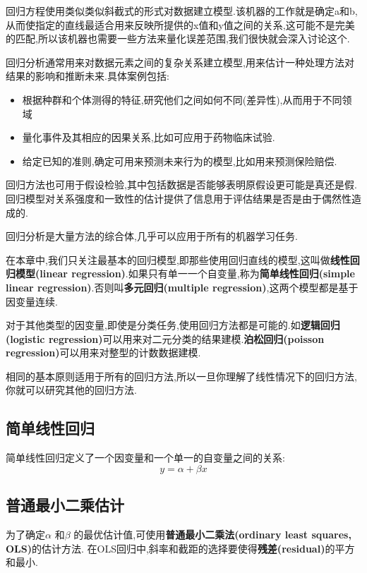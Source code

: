\documentclass[11pt,a4paper,oneside]{book}
\begin{document}
回归方程使用类似类似斜截式的形式对数据建立模型.该机器的工作就是确定a和b,从而使指定的直线最适合用来反映所提供的x值和y值之间的关系,这可能不是完美的匹配,所以该机器也需要一些方法来量化误差范围,我们很快就会深入讨论这个.

回归分析通常用来对数据元素之间的复杂关系建立模型,用来估计一种处理方法对结果的影响和推断未来.具体案例包括:
\begin{itemize}
	\item 根据种群和个体测得的特征,研究他们之间如何不同(差异性),从而用于不同领域
	\item 量化事件及其相应的因果关系,比如可应用于药物临床试验.
	\item 给定已知的准则,确定可用来预测未来行为的模型,比如用来预测保险赔偿.
\end{itemize}

回归方法也可用于假设检验,其中包括数据是否能够表明原假设更可能是真还是假.回归模型对关系强度和一致性的估计提供了信息用于评估结果是否是由于偶然性造成的.

回归分析是大量方法的综合体,几乎可以应用于所有的机器学习任务.

在本章中,我们只关注最基本的回归模型,即那些使用回归直线的模型,这叫做\textbf{线性回归模型(linear regression)}.如果只有单一一个自变量,称为\textbf{简单线性回归(simple linear regression)}.否则叫\textbf{多元回归(multiple regression)},这两个模型都是基于因变量连续.

对于其他类型的因变量,即使是分类任务,使用回归方法都是可能的.如\textbf{逻辑回归(logistic regression)}可以用来对二元分类的结果建模.\textbf{泊松回归(poisson regression)}可以用来对整型的计数数据建模.

相同的基本原则适用于所有的回归方法,所以一旦你理解了线性情况下的回归方法,你就可以研究其他的回归方法.

\subsection{简单线性回归}
简单线性回归定义了一个因变量和一个单一的自变量之间的关系:
\begin{equation}
y=\alpha+\beta x
\end{equation}

\subsection{普通最小二乘估计}
为了确定$ \alpha $ 和$ \beta $ 的最优估计值,可使用\textbf{普通最小二乘法(ordinary least squares, OLS)}的估计方法.
在OLS回归中,斜率和截距的选择要使得\textbf{残差(residual)}的平方和最小.
\end{document}
